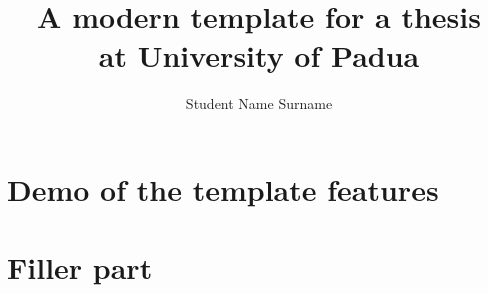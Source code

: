 \documentclass{unipd-thesis-modern} %
\title{A modern template for a thesis\\at University of Padua}
\author{Student Name Surname}
\begin{document}
    \frontmatter

    \mainmatter

    
    \glsresetall  %

    \part{\label{prt:demo}Demo of the template features} %

    


    \part{\label{prt:filler}Filler part}
    
    

    

    
    \begin{appendices}
        
    \end{appendices}

    \backmatter
\end{document}
